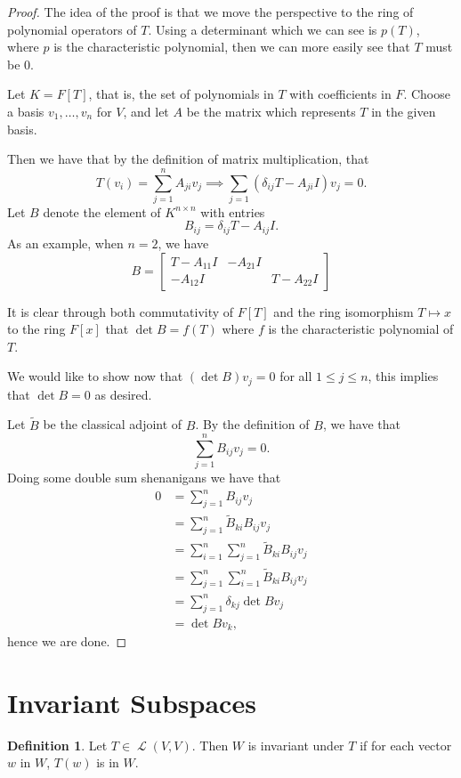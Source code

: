 \documentclass[12pt]{article}
\theoremstyle{plain}
\theoremstyle{definition}
\newtheorem{defn}{Definition}
\newcommand{\Lop}{\operatorname{\mathcal{L}}}
\begin{document}
\begin{proof}
The idea of the proof is that we move the perspective to the ring of polynomial operators of $T$. Using a determinant which we can see is $p(T)$, where $p$ is the characteristic polynomial, then we can more easily see that $T$ must be $0$.

Let $K = F[T]$, that is, the set of polynomials in $T$ with coefficients in $F$. Choose a basis $v_1, \dotsc, v_n$ for $V$, and let $A$ be the matrix which represents $T$ in the given basis.

Then we have that by the definition of matrix multiplication, that 
\[T(v_i) = \sum_{j = 1}^nA_{ji}v_j \implies \sum_{j = 1}(\delta_{ij}T - A_{ji}I)v_j = 0.\]
Let $B$ denote the element of $K^{n \times n}$ with entries
\[B_{ij} = \delta_{ij}T - A_{ij}I.\]
As an example, when $n = 2$, we have
\[B = \begin{bmatrix}T - A_{11}I & -A_{21}I \\ -A_{12}I && T - A_{22}I\end{bmatrix} \]

It is clear through both commutativity of $F[T]$ and the ring isomorphism $T \mapsto x$ to the ring $F[x]$ that $\det{B} = f(T)$ where $f$ is the characteristic polynomial of $T$.

We would like to show now that $(\det{B})v_j = 0$ for all $1 \leq j \leq n$, this implies that $\det{B} = 0$ as desired.

Let $\tilde{B}$ be the classical adjoint of $B$. By the definition of $B$, we have that
\[\sum_{j = 1}^nB_{ij}v_j = 0.\] Doing some double sum shenanigans we have that 
\begin{align*}
0 &= \sum_{j = 1}^nB_{ij}v_j \\
	 &= \sum_{j = 1}^n\tilde{B}_{ki}B_{ij}v_j \\
	 &= \sum_{i = 1}^n\sum_{j = 1}^n\tilde{B}_{ki}B_{ij}v_j \\
	 &= \sum_{j = 1}^n\sum_{i = 1}^n\tilde{B}_{ki}B_{ij}v_j \\
	 &= \sum_{j = 1}^n\delta_{kj}\det{B}v_j \\
	 &= \det{B}v_k,
\end{align*}
hence we are done.
\end{proof}

\section{Invariant Subspaces}

\begin{defn}
Let $T \in \Lop(V, V)$. Then $W$ is invariant under $T$ if for each vector $w$ in $W$, $T(w)$ is in $W$.
\end{defn}
\end{document}
